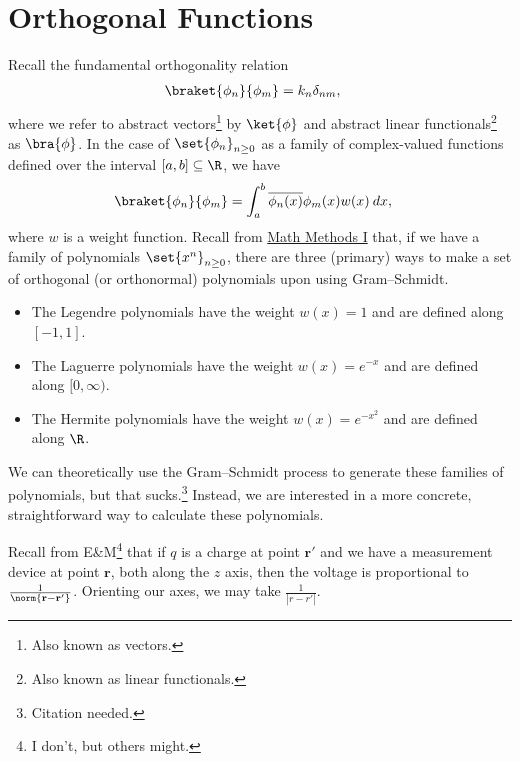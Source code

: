 \documentclass[10pt]{mypackage}
\begin{document}
  \section{Orthogonal Functions}%
  Recall the fundamental orthogonality relation
  \begin{align*}
    \braket{\phi_n}{\phi_m} &= k_n\delta_{nm},
  \end{align*}
  where we refer to abstract vectors\footnote{Also known as vectors.} by $\ket{\phi}$ and abstract linear functionals\footnote{Also known as linear functionals.} as $\bra{\phi}$. In the case of $\set{\phi_n}_{n \geq 0}$ as a family of complex-valued functions defined over the interval $[a,b]\subseteq \R$, we have
  \begin{align*}
    \braket{\phi_n}{\phi_m} &= \int_{a}^{b} \overline{\phi_n(x)}\phi_m(x)w(x)\:dx,
  \end{align*}
  where $w$ is a weight function. Recall from \href{https://ai.avinash-iyer.com/Classes_and_Homework/College/Y4/Y4S1,%20Math%20Methods/math_methods_notes.pdf}{Math Methods I} that, if we have a family of polynomials $\set{x^n}_{n\geq 0}$, there are three (primary) ways to make a set of orthogonal (or orthonormal) polynomials upon using Gram--Schmidt.
    \begin{itemize}
      \item The Legendre polynomials have the weight $w(x) =1$ and are defined along $[-1,1]$.
      \item The Laguerre polynomials have the weight $w(x) = e^{-x}$ and are defined along $[0,\infty)$.
      \item The Hermite polynomials have the weight $w(x) = e^{-x^2}$ and are defined along $\R$.
    \end{itemize}
  We can theoretically use the Gram--Schmidt process to generate these families of polynomials, but that sucks.\footnote{Citation needed.} Instead, we are interested in a more concrete, straightforward way to calculate these polynomials.\newline

  Recall from E\&M\footnote{I don't, but others might.} that if $q$ is a charge at point $\mathbf{r}'$ and we have a measurement device at point $\mathbf{r}$, both along the $z$ axis, then the voltage is proportional to $\frac{1}{\norm{\mathbf{r}-\mathbf{r}'}}$. Orienting our axes, we may take $\frac{1}{\left\vert r-r' \right\vert}$.\newline
\end{document}
